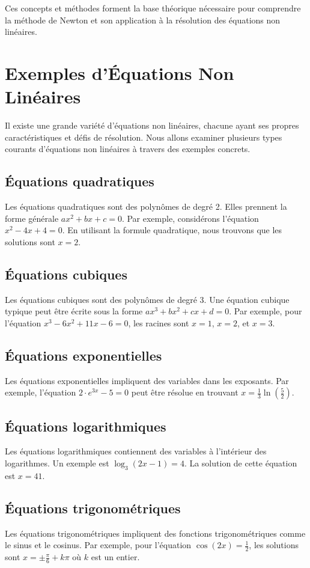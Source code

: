 \documentclass{article}
\begin{document}
Ces concepts et méthodes forment la base théorique nécessaire pour comprendre la méthode de Newton et son application à la résolution des équations non linéaires.

\section{Exemples d'Équations Non Linéaires}

Il existe une grande variété d'équations non linéaires, chacune ayant ses propres caractéristiques et défis de résolution. Nous allons examiner plusieurs types courants d'équations non linéaires à travers des exemples concrets.

\subsection{Équations quadratiques}
Les équations quadratiques sont des polynômes de degré 2. Elles prennent la forme générale $ax^2 + bx + c = 0$. Par exemple, considérons l'équation $x^2 - 4x + 4 = 0$. En utilisant la formule quadratique, nous trouvons que les solutions sont $x = 2$.

\subsection{Équations cubiques}
Les équations cubiques sont des polynômes de degré 3. Une équation cubique typique peut être écrite sous la forme $ax^3 + bx^2 + cx + d = 0$. Par exemple, pour l'équation $x^3 - 6x^2 + 11x - 6 = 0$, les racines sont $x = 1$, $x = 2$, et $x = 3$.

\subsection{Équations exponentielles}
Les équations exponentielles impliquent des variables dans les exposants. Par exemple, l'équation $2 \cdot e^{3x} - 5 = 0$ peut être résolue en trouvant $x = \frac{1}{3} \ln\left(\frac{5}{2}\right)$.

\subsection{Équations logarithmiques}
Les équations logarithmiques contiennent des variables à l'intérieur des logarithmes. Un exemple est $\log_3(2x - 1) = 4$. La solution de cette équation est $x = 41$.

\subsection{Équations trigonométriques}
Les équations trigonométriques impliquent des fonctions trigonométriques comme le sinus et le cosinus. Par exemple, pour l'équation $\cos(2x) = \frac{1}{2}$, les solutions sont $x = \pm \frac{\pi}{6} + k\pi$ où $k$ est un entier.
\end{document}
